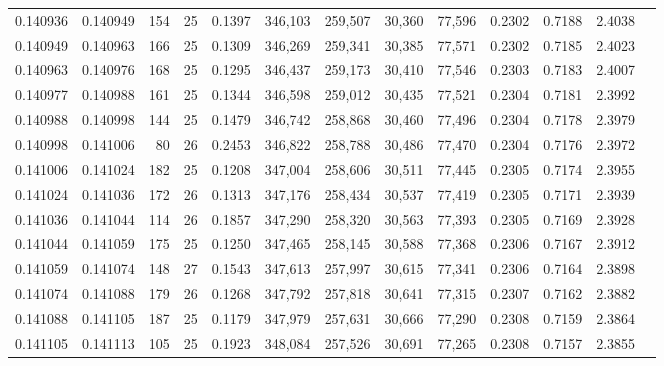 \begin{tabular}{rrrrrrrrrrrrr}
0.140936 & 0.140949 &   154 &  25 &                                     0.1397 & 346,103 & 259,507 &  30,360 &  77,596 & 0.2302 & 0.7188 & 2.4038 \\
0.140949 & 0.140963 &   166 &  25 &                                     0.1309 & 346,269 & 259,341 &  30,385 &  77,571 & 0.2302 & 0.7185 & 2.4023 \\
0.140963 & 0.140976 &   168 &  25 &                                     0.1295 & 346,437 & 259,173 &  30,410 &  77,546 & 0.2303 & 0.7183 & 2.4007 \\
0.140977 & 0.140988 &   161 &  25 &                                     0.1344 & 346,598 & 259,012 &  30,435 &  77,521 & 0.2304 & 0.7181 & 2.3992 \\
0.140988 & 0.140998 &   144 &  25 &                                     0.1479 & 346,742 & 258,868 &  30,460 &  77,496 & 0.2304 & 0.7178 & 2.3979 \\
0.140998 & 0.141006 &    80 &  26 &                                     0.2453 & 346,822 & 258,788 &  30,486 &  77,470 & 0.2304 & 0.7176 & 2.3972 \\
0.141006 & 0.141024 &   182 &  25 &                                     0.1208 & 347,004 & 258,606 &  30,511 &  77,445 & 0.2305 & 0.7174 & 2.3955 \\
0.141024 & 0.141036 &   172 &  26 &                                     0.1313 & 347,176 & 258,434 &  30,537 &  77,419 & 0.2305 & 0.7171 & 2.3939 \\
0.141036 & 0.141044 &   114 &  26 &                                     0.1857 & 347,290 & 258,320 &  30,563 &  77,393 & 0.2305 & 0.7169 & 2.3928 \\
0.141044 & 0.141059 &   175 &  25 &                                     0.1250 & 347,465 & 258,145 &  30,588 &  77,368 & 0.2306 & 0.7167 & 2.3912 \\
0.141059 & 0.141074 &   148 &  27 &                                     0.1543 & 347,613 & 257,997 &  30,615 &  77,341 & 0.2306 & 0.7164 & 2.3898 \\
0.141074 & 0.141088 &   179 &  26 &                                     0.1268 & 347,792 & 257,818 &  30,641 &  77,315 & 0.2307 & 0.7162 & 2.3882 \\
0.141088 & 0.141105 &   187 &  25 &                                     0.1179 & 347,979 & 257,631 &  30,666 &  77,290 & 0.2308 & 0.7159 & 2.3864 \\
0.141105 & 0.141113 &   105 &  25 &                                     0.1923 & 348,084 & 257,526 &  30,691 &  77,265 & 0.2308 & 0.7157 & 2.3855 \\

\end{tabular}
